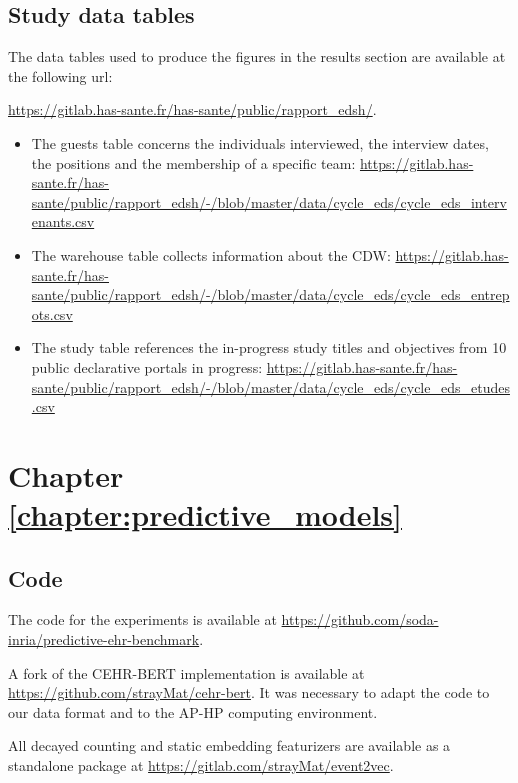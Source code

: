 \documentclass[french,12pt,twoside,a4paper]{book}
\begin{document}
\begin{appendices}
\begin{landscape}
\begin{table}[h!]
    \end{table}
  \end{landscape}

  \section{Study data tables}\label{apd:cdw:study_tables}

  The data tables used to produce the figures in the results section are available
  at the following url:

  \url{https://gitlab.has-sante.fr/has-sante/public/rapport_edsh/}.

  \begin{itemize}
    \item The guests table concerns the individuals interviewed, the interview dates, the
          positions and the membership of a specific team: \url{https://gitlab.has-sante.fr/has-sante/public/rapport_edsh/-/blob/master/data/cycle_eds/cycle_eds_intervenants.csv}
    \item  The warehouse table collects information about the CDW: \url{https://gitlab.has-sante.fr/has-sante/public/rapport_edsh/-/blob/master/data/cycle_eds/cycle_eds_entrepots.csv}
    \item The study table references the in-progress study titles and objectives from 10 public declarative portals in progress: \url{https://gitlab.has-sante.fr/has-sante/public/rapport_edsh/-/blob/master/data/cycle_eds/cycle_eds_etudes.csv}
  \end{itemize}




  \chapter{Chapter \ref{chapter:predictive_models}}\label{apd:predictive_models}

  \section{Code}

  The code for the experiments is available at
  \url{https://github.com/soda-inria/predictive-ehr-benchmark}.

  A fork of the CEHR-BERT implementation is available at \url{https://github.com/strayMat/cehr-bert}. It was necessary
  to adapt the code to our data format and to the AP-HP computing environment.

  All decayed counting and static embedding featurizers are available as a standalone
  package at \url{https://gitlab.com/strayMat/event2vec}.



\end{appendices}
\end{document}
